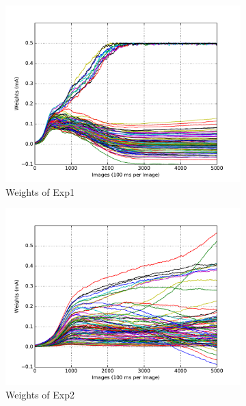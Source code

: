 \begin{figure}
	\centering
	\begin{subfigure}[t]{0.4\textwidth}
		\includegraphics[width=\textwidth]{pics_sdlm/10_exp_SRBM_Orig/exp1_weights_s.pdf}
		\caption{Weights of Exp1}
	\end{subfigure}
	\begin{subfigure}[t]{0.4\textwidth}
		\includegraphics[width=\textwidth]{pics_sdlm/10_exp_SRBM_Orig/exp2_weights_s.pdf}
		\caption{Weights of Exp2}
	\end{subfigure}
	\begin{subfigure}[t]{0.4\textwidth}

\end{subfigure}
\end{figure}

